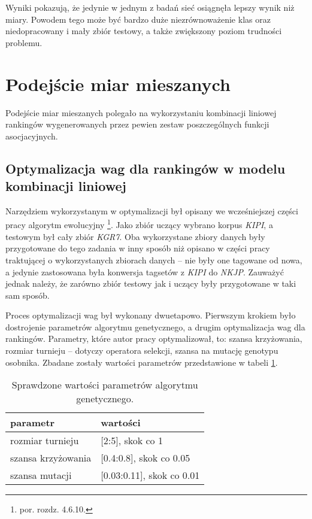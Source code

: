 Wyniki pokazują, że jedynie w jednym z badań sieć osiągnęła lepszy wynik niż miary.
Powodem tego może być bardzo duże niezrównoważenie klas oraz niedopracowany i mały zbiór testowy, a także zwiększony poziom trudności problemu.


\section{Podejście miar mieszanych}
Podejście miar mieszanych polegało na wykorzystaniu kombinacji liniowej rankingów wygenerowanych przez pewien zestaw poszczególnych funkcji asocjacyjnych.

\subsection{Optymalizacja wag dla rankingów w modelu kombinacji liniowej}
Narzędziem wykorzystanym w optymalizacji był opisany we wcześniejszej części pracy algorytm ewolucyjny \footnote{por. rozdz. 4.6.10.}.
Jako zbiór uczący wybrano korpus \emph{KIPI}, a testowym był cały zbiór \emph{KGR7}.
Oba wykorzystane zbiory danych były przygotowane do tego zadania w inny sposób niż opisano w części pracy traktującej o wykorzystanych zbiorach danych -- nie były one tagowane od nowa, a jedynie zastosowana była konwersja tagsetów z \emph{KIPI} do \emph{NKJP}.
Zauważyć jednak należy, że zarówno zbiór testowy jak i uczący były przygotowane w taki sam sposób.

\par
Proces optymalizacji wag był wykonany dwuetapowo.
Pierwszym krokiem było dostrojenie parametrów algorytmu genetycznego, a drugim optymalizacja wag dla rankingów.
Parametry, które autor pracy optymalizował, to: szansa krzyżowania, rozmiar turnieju -- dotyczy operatora selekcji, szansa na mutację genotypu osobnika.
Zbadane zostały wartości parametrów przedstawione w tabeli \ref{optimizer_parameters_optimization}.
\begin{table}[h!]
\centering
\begin{tabular}{ l | l }
	\toprule
	\textbf{parametr} & \textbf{wartości} \\
	\midrule
	rozmiar turnieju & [2:5], skok co 1\\
	szansa krzyżowania & [0.4:0.8], skok co 0.05\\
	szansa mutacji & [0.03:0.11], skok co 0.01\\ 
	\bottomrule
\end{tabular}
\caption[Sprawdzone wartości parametrów algorytmu genetycznego]{Sprawdzone wartości parametrów algorytmu genetycznego.}
\label{optimizer_parameters_optimization}
\end{table}

